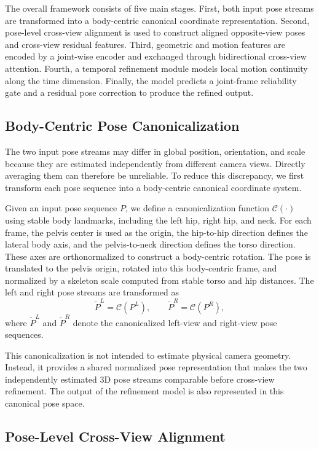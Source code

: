\documentclass[sigconf,screen]{acmart}
\begin{document}
The overall framework consists of five main stages. First, both input pose streams are transformed into a body-centric canonical coordinate representation. Second, pose-level cross-view alignment is used to construct aligned opposite-view poses and cross-view residual features. Third, geometric and motion features are encoded by a joint-wise encoder and exchanged through bidirectional cross-view attention. Fourth, a temporal refinement module models local motion continuity along the time dimension. Finally, the model predicts a joint-frame reliability gate and a residual pose correction to produce the refined output.

\subsection{Body-Centric Pose Canonicalization}
\label{subsec:canonicalization}

The two input pose streams may differ in global position, orientation, and scale because they are estimated independently from different camera views. Directly averaging them can therefore be unreliable. To reduce this discrepancy, we first transform each pose sequence into a body-centric canonical coordinate system.

Given an input pose sequence \(P\), we define a canonicalization function \(\mathcal{C}(\cdot)\) using stable body landmarks, including the left hip, right hip, and neck. For each frame, the pelvis center is used as the origin, the hip-to-hip direction defines the lateral body axis, and the pelvis-to-neck direction defines the torso direction. These axes are orthonormalized to construct a body-centric rotation. The pose is translated to the pelvis origin, rotated into this body-centric frame, and normalized by a skeleton scale computed from stable torso and hip distances. The left and right pose streams are transformed as
\[
\tilde{P}^{L} = \mathcal{C}(P^L), 
\qquad
\tilde{P}^{R} = \mathcal{C}(P^R),
\]
where \(\tilde{P}^{L}\) and \(\tilde{P}^{R}\) denote the canonicalized left-view and right-view pose sequences.

This canonicalization is not intended to estimate physical camera geometry. Instead, it provides a shared normalized pose representation that makes the two independently estimated 3D pose streams comparable before cross-view refinement. The output of the refinement model is also represented in this canonical pose space.

\subsection{Pose-Level Cross-View Alignment}
\label{subsec:pose_alignment}
\end{document}
